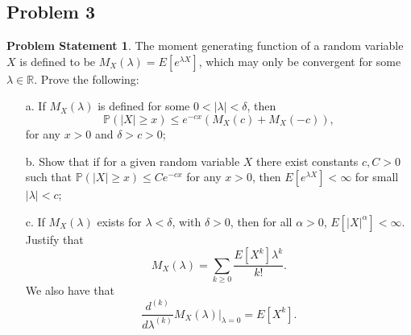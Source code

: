 \documentclass[12pt,reqno]{article}
\theoremstyle{plain}
\theoremstyle{definition}
\newtheorem{problem}[theorem]{Problem Statement}
\newcommand{\PP}[1]{\ensuremath{\mathbb{P}\left(#1\right)}}
\begin{document}
\subsection{Problem 3}

\begin{problem}
The moment generating function of a random variable $X$ is defined to be 
$M_X(\lambda) = E[e^{\lambda X}]$, which may only be convergent for some 
$\lambda \in \mathbb{R}$. Prove the following: 
\begin{itemize} 

\item[a.] If $M_X(\lambda)$ is defined for some $0 < |\lambda| < \delta$,
     then 
     \[
     \PP{|X| \geq x} \leq e^{-cx}\left(M_X(c)+M_X(-c)\right), 
     \]
     for any $x > 0$ and $\delta > c > 0$; 
\item[b.] Show that if for a given random variable $X$ there exist constants 
     $c,C > 0$ such that $\PP{|X| \geq x} \leq C e^{-cx}$ for any $x > 0$, 
     then $E[e^{\lambda X}] < \infty$ for small $|\lambda| < c$; 
\item[c.] If $M_X(\lambda)$ exists for $\lambda < \delta$, with $\delta > 0$, 
     then for all $\alpha > 0$, $E[|X|^{\alpha}] < \infty$. Justify that 
     \[
     M_X(\lambda) = \sum_{k \geq 0} \frac{E[X^k] \lambda^k}{k!}. 
     \]
     We also have that 
     \[
     \frac{d^{(k)}}{d\lambda^{(k)}} M_X(\lambda) \Bigr\rvert_{\lambda = 0} = 
          E[X^k]. 
     \]

\end{itemize} 
\end{problem} 
\end{document}

